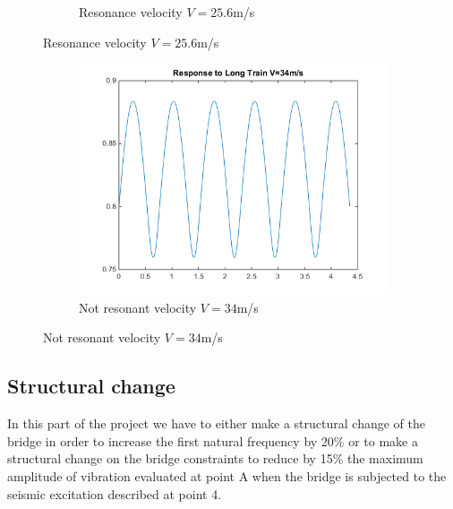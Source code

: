\documentclass[10pt,a4paper,final]{report}
\begin{document}
\begin{figure}[h]
\begin{subfigure}[t]{0.5\textwidth}
                \caption{Resonance velocity $V=25.6$m/s}
                \label{fig:earthquake5}
        \end{subfigure}
         \label{fig:earthquake45}
\end{figure}

\begin{figure}[h]
        \centering
        \begin{subfigure}[t]{0.5\textwidth}
                \includegraphics[width=\textwidth]{train6}
                \caption{Not resonant velocity $V=34$m/s}
                \label{fig:earthquake6}
        \end{subfigure}%
\end{figure}
\newpage
\subsection{Structural change}
In this part of the project we have to either make a structural change of the bridge in order to increase the first natural frequency by 20\% or to make a structural change on the bridge constraints to reduce by 15\% the maximum amplitude of vibration evaluated at point A when the bridge is subjected to the seismic excitation described at point 4.
\end{document}

